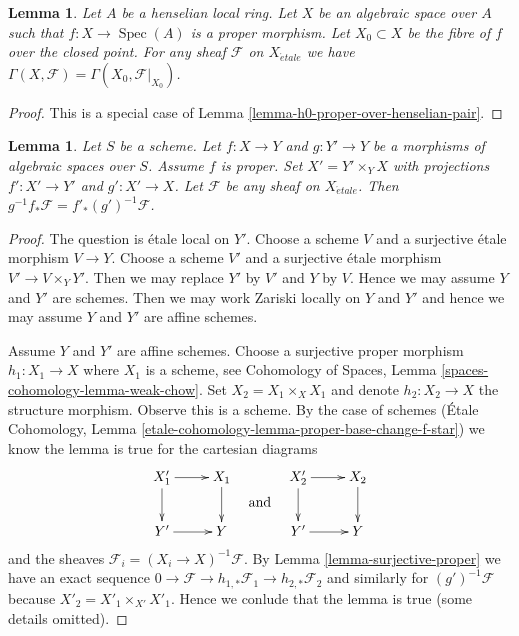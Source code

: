 \documentclass[10pt,a4paper]{amsart}
\theoremstyle{plain}
\newtheorem{lemma}[subsection]{Lemma}
\theoremstyle{definition}
\theoremstyle{remark}
\numberwithin{equation}{subsection}
\def\Spec{\mathop{\mathrm{Spec}}}
\def\etale{{\acute{e}tale}}
\begin{document}
\begin{lemma}
\label{lemma-h0-proper-over-henselian-local}
Let $A$ be a henselian local ring. Let $X$ be an algebraic space
over $A$ such that $f : X \to \Spec(A)$
is a proper morphism. Let $X_0 \subset X$ be the fibre of
$f$ over the closed point. For any sheaf $\mathcal{F}$ on $X_\etale$ we
have $\Gamma(X, \mathcal{F}) = \Gamma(X_0, \mathcal{F}|_{X_0})$.
\end{lemma}

\begin{proof}
This is a special case of Lemma \ref{lemma-h0-proper-over-henselian-pair}.
\end{proof}

\begin{lemma}
\label{lemma-proper-base-change-f-star}
Let $S$ be a scheme. Let $f : X \to Y$ and $g : Y' \to Y$
be a morphisms of algebraic spaces over $S$. Assume $f$ is proper.
Set $X' = Y' \times_Y X$ with projections $f' : X' \to Y'$ and $g' : X' \to X$.
Let $\mathcal{F}$ be any sheaf on $X_\etale$. Then
$g^{-1}f_*\mathcal{F} = f'_*(g')^{-1}\mathcal{F}$.
\end{lemma}

\begin{proof}
The question is \'etale local on $Y'$. Choose a scheme $V$ and a surjective
\'etale morphism $V \to Y$. Choose a scheme $V'$ and a surjective \'etale
morphism $V' \to V \times_Y Y'$. Then we may replace $Y'$ by $V'$ and
$Y$ by $V$. Hence we may assume $Y$ and $Y'$ are schemes.
Then we may work Zariski locally on $Y$ and $Y'$ and hence we may
assume $Y$ and $Y'$ are affine schemes.

\medskip\noindent
Assume $Y$ and $Y'$ are affine schemes. Choose a surjective proper morphism
$h_1 : X_1 \to X$ where $X_1$ is a scheme, see
Cohomology of Spaces, Lemma \ref{spaces-cohomology-lemma-weak-chow}.
Set $X_2 = X_1 \times_X X_1$ and denote
$h_2 : X_2 \to X$ the structure morphism. Observe this is a scheme.
By the case of schemes
(\'Etale Cohomology, Lemma
\ref{etale-cohomology-lemma-proper-base-change-f-star})
we know the lemma is true for the cartesian diagrams
$$
\vcenter{
\xymatrix{
X'_1 \ar[r] \ar[d] & X_1 \ar[d] \\
Y' \ar[r] & Y
}
}
\quad\text{and}\quad
\vcenter{
\xymatrix{
X'_2 \ar[r] \ar[d] & X_2 \ar[d] \\
Y' \ar[r] & Y
}
}
$$
and the sheaves $\mathcal{F}_i = (X_i \to X)^{-1}\mathcal{F}$.
By Lemma \ref{lemma-surjective-proper} we have an exact sequence
$0 \to \mathcal{F} \to h_{1, *}\mathcal{F}_1 \to h_{2, *}\mathcal{F}_2$
and similarly for $(g')^{-1}\mathcal{F}$ because
$X'_2 = X'_1 \times_{X'} X'_1$. Hence we conlude that the
lemma is true (some details omitted).
\end{proof}
\end{document}
